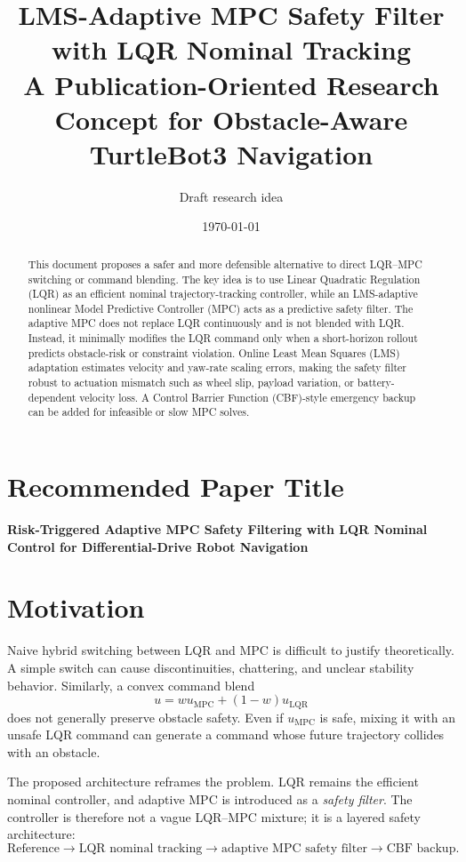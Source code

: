 \documentclass[11pt,a4paper]{article}
\title{\textbf{LMS-Adaptive MPC Safety Filter with LQR Nominal Tracking}\\
\large A Publication-Oriented Research Concept for Obstacle-Aware TurtleBot3 Navigation}
\author{Draft research idea}
\date{\today}
\begin{document}
\maketitle

\begin{abstract}
This document proposes a safer and more defensible alternative to direct LQR--MPC switching or command blending. The key idea is to use Linear Quadratic Regulation (LQR) as an efficient nominal trajectory-tracking controller, while an LMS-adaptive nonlinear Model Predictive Controller (MPC) acts as a predictive safety filter. The adaptive MPC does not replace LQR continuously and is not blended with LQR. Instead, it minimally modifies the LQR command only when a short-horizon rollout predicts obstacle-risk or constraint violation. Online Least Mean Squares (LMS) adaptation estimates velocity and yaw-rate scaling errors, making the safety filter robust to actuation mismatch such as wheel slip, payload variation, or battery-dependent velocity loss. A Control Barrier Function (CBF)-style emergency backup can be added for infeasible or slow MPC solves.
\end{abstract}

\section{Recommended Paper Title}
\textbf{Risk-Triggered Adaptive MPC Safety Filtering with LQR Nominal Control for Differential-Drive Robot Navigation}

\section{Motivation}
Naive hybrid switching between LQR and MPC is difficult to justify theoretically. A simple switch can cause discontinuities, chattering, and unclear stability behavior. Similarly, a convex command blend
\[
u = w u_{\mathrm{MPC}} + (1-w)u_{\mathrm{LQR}}
\]
does not generally preserve obstacle safety. Even if $u_{\mathrm{MPC}}$ is safe, mixing it with an unsafe LQR command can generate a command whose future trajectory collides with an obstacle.

The proposed architecture reframes the problem. LQR remains the efficient nominal controller, and adaptive MPC is introduced as a \emph{safety filter}. The controller is therefore not a vague LQR--MPC mixture; it is a layered safety architecture:
\[
\text{Reference} \rightarrow \text{LQR nominal tracking} \rightarrow \text{adaptive MPC safety filter} \rightarrow \text{CBF backup}.
\]
\end{document}
